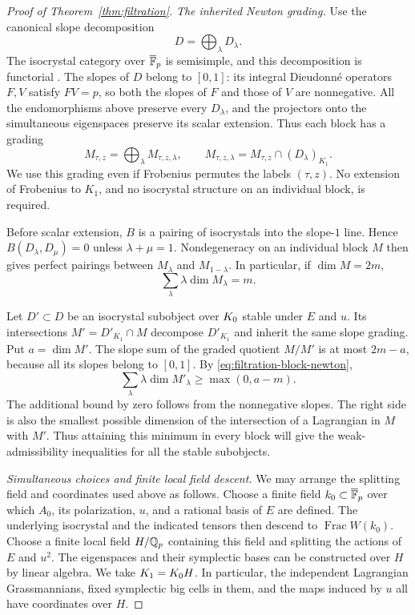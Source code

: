 \begin{proof}[Proof of Theorem~\ref{thm:filtration}]
\medskip\noindent
\emph{The inherited Newton grading.}
Use the canonical slope decomposition
\[
 D=\bigoplus_\lambda D_\lambda.
\]
The isocrystal category over $\overline{\mathbb F}_p$ is semisimple, and
this decomposition is functorial
\cite[\S3.2, Proposition~3.3]{ColmezFontaine2000}.  The slopes of $D$
belong to $[0,1]$: its integral Dieudonn\'e operators \(F,V\)
satisfy \(FV=p\), so both the slopes of \(F\) and those of \(V\)
are nonnegative.  All the endomorphisms above preserve every
$D_\lambda$, and the projectors onto the simultaneous eigenspaces
preserve its scalar extension.  Thus each block has a grading
\[
 M_{\tau,z}=\bigoplus_\lambda M_{\tau,z,\lambda},\qquad
 M_{\tau,z,\lambda}=M_{\tau,z}\cap(D_\lambda)_{K_1}.
\]
We use this grading even if Frobenius permutes the labels $(\tau,z)$.
No extension of Frobenius to $K_1$, and no isocrystal structure on an
individual block, is required.

Before scalar extension, $B$ is a pairing of isocrystals into the
slope-$1$ line.  Hence $B(D_\lambda,D_\mu)=0$ unless
$\lambda+\mu=1$.  Nondegeneracy on an individual block $M$ then gives
perfect pairings between $M_\lambda$ and $M_{1-\lambda}$.  In
particular, if $\dim M=2m$,
\begin{equation}
\label{eq:filtration-block-newton}
 \sum_\lambda\lambda\dim M_\lambda=m.
\end{equation}

Let $D'\subset D$ be an isocrystal subobject over $K_0$ stable
under $E$ and $u$.  Its intersections $M'=D'_{K_1}\cap M$ decompose
$D'_{K_1}$ and inherit the same slope grading.  Put $a=\dim M'$.
The slope sum of the graded quotient $M/M'$ is at most $2m-a$,
because all its slopes belong to $[0,1]$.  By
\eqref{eq:filtration-block-newton},
\begin{equation}
\label{eq:filtration-block-bound}
 \sum_\lambda\lambda\dim M'_\lambda
 \geq \max(0,a-m).
\end{equation}
The additional bound by zero follows from the nonnegative slopes.
The right side is also the smallest possible dimension of the
intersection of a Lagrangian in $M$ with $M'$.
Thus attaining this minimum in every block will give the
weak-admissibility inequalities for all the stable subobjects.

\medskip\noindent
\emph{Simultaneous choices and finite local field descent.}
We may arrange the splitting field and coordinates used above as
follows.  Choose a finite field $k_0\subset\overline{\mathbb F}_p$ over
which $A_0$, its polarization, $u$, and a rational basis of $E$ are
defined.  The underlying isocrystal and the indicated tensors then
descend to $\operatorname{Frac}W(k_0)$.  Choose a finite local field
$H/\mathbb Q_p$ containing this field and splitting the actions of $E$ and
$u^2$.  The eigenspaces and their symplectic bases can be constructed
over $H$ by linear algebra.  We take $K_1=K_0 H$.  In particular,
the independent Lagrangian Grassmannians, fixed symplectic big cells
in them, and the maps induced by $u$ all have coordinates over $H$.


\end{proof}
